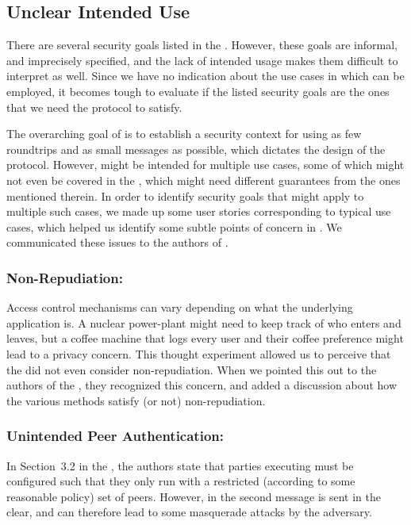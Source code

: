\documentclass[runningheads]{llncs}
\begin{document}
\subsection{Unclear Intended Use}
\label{sec:unclearProtocolUse}
%
There are several security goals listed in the \mSpec{}.
%
However, these goals are informal, and imprecisely specified, and the lack of intended usage makes them difficult to interpret as well.
%
Since we have no indication about the use cases in which \mEdhoc{} can be employed, it becomes tough to evaluate if the listed security goals are the ones that we need the protocol to satisfy.

The overarching goal of \mEdhoc{} is to establish a security context for \mOscore{} using as few roundtrips and as small messages as possible, which dictates the design of the protocol.
%
However, \mEdhoc{} might be intended for multiple use cases, some of which might not even be covered in the \mSpec{}, which might need different guarantees from the ones mentioned therein.
%
In order to identify security goals that might apply to multiple such cases, we made up some user stories corresponding to typical use cases, which helped us identify some subtle points of concern in \mEdhoc.
%
We communicated these issues to the authors of \mEdhoc{}.
%

\subsubsection{Non-Repudiation:}
Access control mechanisms can vary depending on what the underlying application is.
%
A nuclear power-plant might need to keep track of who enters and leaves, but a coffee machine that logs every user and their coffee preference might lead to a privacy concern.
%
This thought experiment allowed us to perceive that the \mEdhoc{} \mSpec{} did not even consider non-repudiation.
%
When we pointed this out to the authors of the \mSpec, they recognized this concern, and added a discussion about how the various \mEdhoc{} methods satisfy (or not) non-repudiation.

\subsubsection{Unintended Peer Authentication: }
In Section~3.2 in the \mSpec{}, the authors state that parties executing \mEdhoc{} must be configured such that they only run \mEdhoc{} with a restricted (according to some reasonable policy) set of peers.
%
However, \mIdcredr{} in the second message is sent in the clear, and can therefore lead to some masquerade attacks by the adversary.
%
\end{document}
